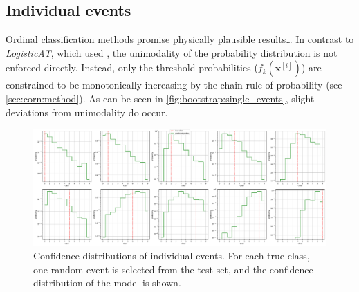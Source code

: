 \subsection{Individual events}
Ordinal classification methods promise physically plausible results… %
In contrast to \emph{LogisticAT},
    which \citeauthor{dsea_jan} used \cite{dsea_jan},
  the unimodality of the probability distribution is not enforced directly.
Instead,
  only the threshold probabilities ($f_k(\mathbf{x}^{[i]})$) are constrained to be monotonically increasing
  by the chain rule of probability
  (see \autoref{sec:corn:method}).
As can be seen in \autoref{fig:bootstrap:single_events},
  slight deviations from unimodality do occur.


\begin{figure}
  \centering
  \includegraphics[width=\textwidth]{content/plots/halftime/single_events.pdf}
  \caption{
    Confidence distributions of individual events.
    For each true class,
    one random event is selected from the test set,
    and the confidence distribution of the model is shown.
  }
  \label{fig:bootstrap:single_events}
\end{figure}
